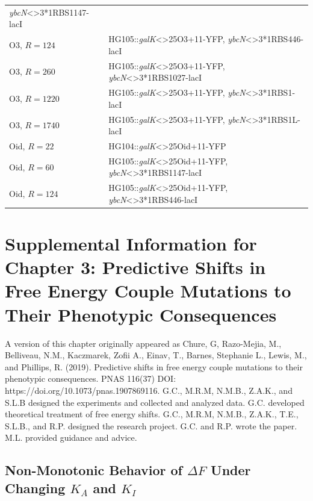 \documentclass[12pt]{caltech_thesis}
\begin{document}
\begin{longtable}[]{@{}ll@{}}
\emph{ybcN}\textless\textgreater3*1RBS1147-lacI \\
O3, \(R=124\) & HG105::\emph{galK}\textless\textgreater25O3+11-YFP,
\emph{ybcN}\textless\textgreater3*1RBS446-lacI \\
O3, \(R=260\) & HG105::\emph{galK}\textless\textgreater25O3+11-YFP,
\emph{ybcN}\textless\textgreater3*1RBS1027-lacI \\
O3, \(R=1220\) & HG105::\emph{galK}\textless\textgreater25O3+11-YFP,
\emph{ybcN}\textless\textgreater3*1RBS1-lacI \\
O3, \(R=1740\) & HG105::\emph{galK}\textless\textgreater25O3+11-YFP,
\emph{ybcN}\textless\textgreater3*1RBS1L-lacI \\
Oid, \(R=22\) & HG104::\emph{galK}\textless\textgreater25Oid+11-YFP \\
Oid, \(R=60\) & HG105::\emph{galK}\textless\textgreater25Oid+11-YFP,
\emph{ybcN}\textless\textgreater3*1RBS1147-lacI \\
Oid, \(R=124\) & HG105::\emph{galK}\textless\textgreater25Oid+11-YFP,
\emph{ybcN}\textless\textgreater3*1RBS446-lacI \\
\bottomrule()
\end{longtable}

\hypertarget{supplemental-information-for-chapter-3-predictive-shifts-in-free-energy-couple-mutations-to-their-phenotypic-consequences}{%
\chapter{Supplemental Information for Chapter 3: Predictive Shifts in
Free Energy Couple Mutations to Their Phenotypic
Consequences}\label{supplemental-information-for-chapter-3-predictive-shifts-in-free-energy-couple-mutations-to-their-phenotypic-consequences}}

A version of this chapter originally appeared as Chure, G, Razo-Mejia,
M., Belliveau, N.M., Kaczmarek, Zofii A., Einav, T., Barnes, Stephanie
L., Lewis, M., and Phillips, R. (2019). Predictive shifts in free energy
couple mutations to their phenotypic consequences. PNAS 116(37) DOI:
https://doi.org/10.1073/pnas.1907869116. G.C., M.R.M, N.M.B., Z.A.K.,
and S.L.B designed the experiments and collected and analyzed data. G.C.
developed theoretical treatment of free energy shifts. G.C., M.R.M,
N.M.B., Z.A.K., T.E., S.L.B., and R.P. designed the research project.
G.C. and R.P. wrote the paper. M.L. provided guidance and advice.

\hypertarget{non-monotonic-behavior-of-delta-f-under-changing-k_a-and-k_i}{%
\section{\texorpdfstring{Non-Monotonic Behavior of \(\Delta F\) Under
Changing \(K_A\) and
\(K_I\)}{Non-Monotonic Behavior of \textbackslash Delta F Under Changing K\_A and K\_I}}\label{non-monotonic-behavior-of-delta-f-under-changing-k_a-and-k_i}}
\end{document}

